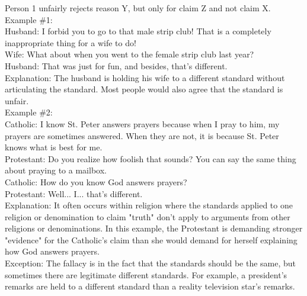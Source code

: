\documentclass[a4paper,12pt,single,pdftex]{scrbook}
\begin{document}
    
      Person 1 unfairly rejects reason Y, but only for claim Z and not claim X.
    \\

    
      Example \#1:
    \\

    
      Husband: I forbid you to go to that male strip club! That is a completely inappropriate thing for a wife to do!
    \\

    
      Wife: What about when you went to the female strip club last year?
    \\

    
      Husband: That was just for fun, and besides, that's different.
    \\

    
      Explanation: The husband is holding his wife to a different standard without articulating the standard. Most people would also agree that the standard is unfair.
    \\

    
      Example \#2:
    \\

    
      Catholic: I know St. Peter answers prayers because when I pray to him, my prayers are sometimes answered. When they are not, it is because St. Peter knows what is best for me.
    \\

    
      Protestant: Do you realize how foolish that sounds? You can say the same thing about praying to a mailbox.
    \\

    
      Catholic: How do you know God answers prayers?
    \\

    
      Protestant: Well... I... that's different.
    \\

    
      Explanation: It often occurs within religion where the standards applied to one religion or denomination to claim "truth" don't apply to arguments from other religions or denominations. In this example, the Protestant is demanding stronger "evidence" for the Catholic's claim than she would demand for herself explaining how God answers prayers.
    \\

    
      Exception: The fallacy is in the fact that the standards should  be the same, but sometimes there are legitimate different standards. For example, a president's remarks are held to a different standard than a reality television star’s remarks.
    \\
\end{document}
